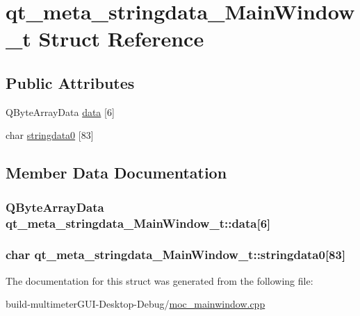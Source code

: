 \hypertarget{structqt__meta__stringdata___main_window__t}{\section{qt\-\_\-meta\-\_\-stringdata\-\_\-\-Main\-Window\-\_\-t Struct Reference}
\label{structqt__meta__stringdata___main_window__t}
}
\subsection*{Public Attributes}
\begin{DoxyCompactItemize}
\item 
Q\-Byte\-Array\-Data \hyperlink{structqt__meta__stringdata___main_window__t_a8f79e56d12892a8825330286a07da625}{data} \mbox{[}6\mbox{]}
\item 
char \hyperlink{structqt__meta__stringdata___main_window__t_abf6d056efaf25761f61885869e88a3fa}{stringdata0} \mbox{[}83\mbox{]}
\end{DoxyCompactItemize}


\subsection{Member Data Documentation}
\hypertarget{structqt__meta__stringdata___main_window__t_a8f79e56d12892a8825330286a07da625}{
\subsubsection[{data}]{\setlength{\rightskip}{0pt plus 5cm}Q\-Byte\-Array\-Data qt\-\_\-meta\-\_\-stringdata\-\_\-\-Main\-Window\-\_\-t\-::data\mbox{[}6\mbox{]}}}\label{structqt__meta__stringdata___main_window__t_a8f79e56d12892a8825330286a07da625}
\hypertarget{structqt__meta__stringdata___main_window__t_abf6d056efaf25761f61885869e88a3fa}{
\subsubsection[{stringdata0}]{\setlength{\rightskip}{0pt plus 5cm}char qt\-\_\-meta\-\_\-stringdata\-\_\-\-Main\-Window\-\_\-t\-::stringdata0\mbox{[}83\mbox{]}}}\label{structqt__meta__stringdata___main_window__t_abf6d056efaf25761f61885869e88a3fa}


The documentation for this struct was generated from the following file\-:\begin{DoxyCompactItemize}
\item 
build-\/multimeter\-G\-U\-I-\/\-Desktop-\/\-Debug/\hyperlink{moc__mainwindow_8cpp}{moc\-\_\-mainwindow.\-cpp}\end{DoxyCompactItemize}
